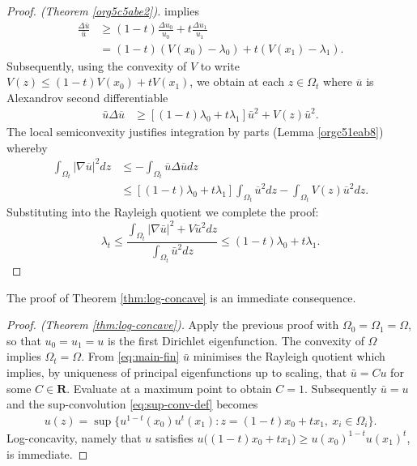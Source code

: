 \documentclass[12pt]{amsart}
\newenvironment{pf}{\begin{proof}}{\end{proof}}
\theoremstyle{definition}
\theoremstyle{remark}
\begin{document}
\begin{pf}[Proof. (Theorem \ref{org5c5abe2})]
implies
  \begin{align*} \frac{\Delta \bar{u}}{\bar{u}} &\geq (1-t)\frac{\Delta u_0}{u_0} + t \frac{\Delta
u_1}{u_1} \\ &=(1-t)(V(x_0)- \lambda_0) + t (V(x_1)-\lambda_1).
  \end{align*} Subsequently, using the convexity of $V$ to write $V(z) \leq
(1-t)V(x_0)+tV(x_1)$, we obtain at each $z \in \Omega_t$ where $\overline{u}$ is Alexandrov second differentiable
\begin{align*} \bar{u}\Delta \overline{u} &\geq[(1-t)\lambda_0+t\lambda_1]\bar{u}^{2} +
V(z)\bar{u}^2.
\end{align*} The local semiconvexity justifies integration by parts (Lemma
\ref{orgc51eab8}) whereby
  \begin{align*} \int_{\Omega_t} |\nabla \overline{u}|^2 dz &\leq -\int_{\Omega_t} \overline{u} \Delta
\overline{u} dz \\ & \leq \left[(1-t) \lambda_0 + t \lambda_1\right] \int_{\Omega_t} \overline{u}^2 dz
- \int_{\Omega_t}V(z) \overline{u}^2 dz.
  \end{align*} Substituting into the Rayleigh quotient we complete the proof:
  \begin{equation}
    \label{eq:main-fin}
    \lambda_t \leq \frac{\int_{\Omega_t} |\nabla \bar{u}|^2 + V\bar{u}^2dz}{\int_{\Omega_t} \bar{u}^2 dz} \leq
    (1-t)\lambda_0 + t \lambda_1.
  \end{equation}

\end{pf}

The proof of Theorem \ref{thm:log-concave} is an immediate consequence.

\begin{proof}[Proof. (Theorem \ref{thm:log-concave})] Apply the previous proof
with $\Omega_0 = \Omega_1 = \Omega$, so that $u_0 = u_1 = u$ is the first Dirichlet
eigenfunction. The convexity of $\Omega$ implies $\Omega_t = \Omega$. From \eqref{eq:main-fin} $\bar{u}$ minimises the Rayleigh quotient which implies, by uniqueness of principal eigenfunctions up to scaling, that $\bar{u} = C u$ for some $C \in \mathbf{R}$. Evaluate
at a maximum point to obtain $C=1$.  Subsequently $\bar{u} = u$ and the sup-convolution \eqref{eq:sup-conv-def} becomes
  \begin{align*} u(z) = \sup\{u^{1-t}(x_0)u^t(x_1) : z = (1-t)x_0 + tx_1, \> x_i
\in \Omega_i\}.
  \end{align*} Log-concavity, namely that $u$ satisfies
$u\big((1-t)x_0+tx_1\big) \geq u(x_0)^{1-t}u(x_1)^t$, is immediate.
\end{proof}
\end{document}
